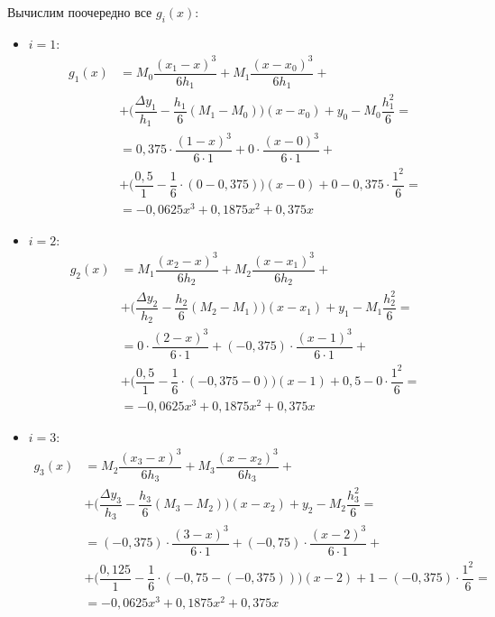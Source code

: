 \documentclass[a4paper, 12pt]{article}
\begin{document}
	Вычислим поочередно все $g_i(x)$:
	\begin{itemize}
		\item $i=1$:
		\begin{equation*}
			\begin{aligned}
				g_1(x)&=M_{0}\dfrac{(x_1-x)^3}{6h_1}+M_{1}\dfrac{(x-x_{0})^3}{6h_1}+\\&+\bigg(\dfrac{\Delta y_1}{h_1}-\dfrac{h_1}{6}(M_1-M_{0})\bigg)(x-x_0)+y_{0}-M_{0}\dfrac{h_1^2}{6}=\\
				&=0,375\cdot\dfrac{(1-x)^3}{6\cdot 1}+0\cdot \dfrac{(x-0)^3}{6\cdot 1}+\\&+\bigg(\dfrac{0,5}{1}-\dfrac{1}{6}\cdot(0-0,375)\bigg)(x-0)+0-0,375\cdot\dfrac{1^2}{6}=\\
				&=-0,0625x^3+0,1875x^2+0,375x
			\end{aligned}
		\end{equation*}
		\item $i=2$:
		\begin{equation*}
			\begin{aligned}
				g_2(x)&=M_{1}\dfrac{(x_2-x)^3}{6h_2}+M_{2}\dfrac{(x-x_{1})^3}{6h_2}+\\&+\bigg(\dfrac{\Delta y_2}{h_2}-\dfrac{h_2}{6}(M_2-M_{1})\bigg)(x-x_1)+y_{1}-M_{1}\dfrac{h_2^2}{6}=\\
				&=0\cdot\dfrac{(2-x)^3}{6\cdot 1}+(-0,375)\cdot \dfrac{(x-1)^3}{6\cdot 1}+\\&+\bigg(\dfrac{0,5}{1}-\dfrac{1}{6}\cdot(-0,375-0)\bigg)(x-1)+0,5-0\cdot\dfrac{1^2}{6}=\\
				&=-0,0625x^3+0,1875x^2+0,375x
			\end{aligned}
		\end{equation*}
		\item $i=3$:
		\begin{equation*}
			\begin{aligned}
				g_3(x)&=M_{2}\dfrac{(x_3-x)^3}{6h_3}+M_{3}\dfrac{(x-x_{2})^3}{6h_3}+\\&+\bigg(\dfrac{\Delta y_3}{h_3}-\dfrac{h_3}{6}(M_3-M_{2})\bigg)(x-x_2)+y_{2}-M_{2}\dfrac{h_3^2}{6}=\\
				&=(-0,375)\cdot\dfrac{(3-x)^3}{6\cdot 1}+(-0,75)\cdot \dfrac{(x-2)^3}{6\cdot 1}+\\&+\bigg(\dfrac{0,125}{1}-\dfrac{1}{6}\cdot(-0,75-(-0,375))\bigg)(x-2)+1-(-0,375)\cdot\dfrac{1^2}{6}=\\
				&=-0,0625x^3+0,1875x^2+0,375x
			\end{aligned}
		\end{equation*}
	\end{itemize}
	
\end{document}
